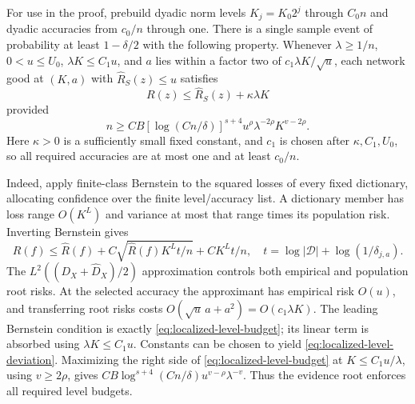 For use in the proof, prebuild dyadic norm levels $K_j=K_0 2^j$
through $C_0n$ and dyadic accuracies from $c_0/n$ through one.
There is a single sample event of probability at least $1-\delta/2$
with the following property. Whenever $\lambda\ge1/n$,
$0<u\le U_0$, $\lambda K\le C_1u$, and $a$ lies within a factor two
of $c_1\lambda K/\sqrt u$, each network good at $(K,a)$ with
$\widehat R_S(z)\le u$ satisfies
\begin{equation}
 R(z)\le\widehat R_S(z)+\kappa\lambda K
 \label{eq:localized-level-deviation}
\end{equation}
provided
\begin{equation}
 n\ge C B[\log(Cn/\delta)]^{s+4}
       u^\rho\lambda^{-2\rho}K^{v-2\rho}.
 \label{eq:localized-level-budget}
\end{equation}
Here $\kappa>0$ is a sufficiently small fixed constant, and $c_1$
is chosen after $\kappa,C_1,U_0$, so all required accuracies are at most
one and at least $c_0/n$.

Indeed, apply finite-class Bernstein to the squared losses of every
fixed dictionary, allocating confidence over the finite level/accuracy
list. A dictionary member has loss range $O(K^L)$ and variance at most
that range times its population risk. Inverting Bernstein gives
\[
 R(f)\le\widehat R(f)+C\sqrt{\widehat R(f)K^L t/n}+C K^L t/n,
 \quad t=\log|\mathcal D|+\log(1/\delta_{j,a}).
\]
The $L^2((D_X+\widehat D_X)/2)$ approximation controls both empirical
and population root risks. At the selected accuracy the approximant
has empirical risk $O(u)$, and transferring root risks costs
$O(\sqrt u\,a+a^2)=O(c_1\lambda K)$.
The leading Bernstein condition is exactly
\eqref{eq:localized-level-budget}; its linear term is absorbed using
$\lambda K\le C_1u$. Constants can be chosen to yield
\eqref{eq:localized-level-deviation}.
Maximizing the right side of \eqref{eq:localized-level-budget} at
$K\le C_1u/\lambda$, using $v\ge2\rho$, gives
$C B\log^{s+4}(Cn/\delta)u^{v-\rho}\lambda^{-v}$.
Thus the evidence root enforces all required level budgets.


